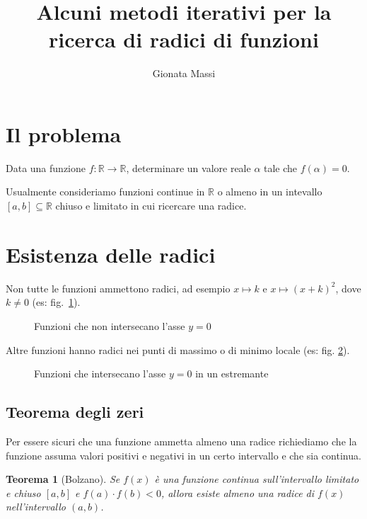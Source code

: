 \documentclass[12pt]{article}
\title{Alcuni metodi iterativi per la ricerca di radici di funzioni}
\author{Gionata Massi}
\date{} %
\theoremstyle{plain}%
\newtheorem{thm}{Teorema}[section]
\theoremstyle{definition}
\theoremstyle{remark}
\begin{document}
\maketitle

\thispagestyle{empty}%

\tableofcontents

\section{Il problema}

Data una funzione $f : \mathbb{R} \to \mathbb{R}$, determinare un valore reale $\alpha$ tale che $f(\alpha) = 0$.

Usualmente consideriamo funzioni continue in $\mathbb{R}$ o almeno in un intevallo $[a, b] \subseteq \mathbb{R}$ chiuso e limitato in cui ricercare una radice.

\section{Esistenza delle radici}

Non tutte le funzioni ammettono radici, ad esempio $x \mapsto k$ e $x \mapsto (x + k)^2$, dove $k \neq 0$ (es: fig.~\ref{fig:no_zeri}).

\begin{figure}[ht]
    \centering
    
    \caption{Funzioni che non intersecano l'asse $y = 0$}
    \label{fig:no_zeri}
\end{figure}
    
Altre funzioni hanno radici nei punti di massimo o di minimo locale (es: fig. \ref{fig:zero_estremante}).

\begin{figure}[ht]
    \centering
    
    \caption{Funzioni che intersecano l'asse $y = 0$ in un estremante}
    \label{fig:zero_estremante}
\end{figure}

\subsection{Teorema degli zeri}

Per essere sicuri che una funzione ammetta almeno una radice richiediamo che la funzione assuma valori positivi e negativi in un certo intervallo e che sia continua.

\begin{thm}[Bolzano]
Se $f (x)$ è una funzione continua sull'intervallo limitato e chiuso $[a, b]$ e $f (a) \cdot f (b) < 0$, allora esiste almeno una radice di $f (x)$ nell'intervallo $(a, b)$.
\end{thm}
\end{document}
